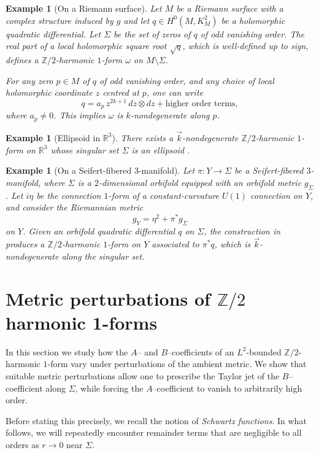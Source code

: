 \documentclass[11pt]{amsart}
\newcommand{\R}{\mathbb{R}}
\newcommand{\ZT}{\mathbb{Z}/2}
\newtheorem{example}[theorem]{Example}
\begin{document}
\begin{example}[On a Riemann surface]
	Let $M$ be a Riemann surface with a complex structure induced by $g$ and let $q\in H^0(M,K_M^2)$ be a holomorphic quadratic differential. 
	Let $\Sigma$ be the set of zeros of $q$ of odd vanishing order.
	The real part of a local holomorphic square root $\sqrt{q}$, which is well-defined up to sign, defines a $\ZT$-harmonic $1$-form $\omega$ on $M\setminus \Sigma$.
	
	For any zero $p \in M$ of $q$ of odd vanishing order, and any choice of local holomorphic coordinate $z$ centred at $p$, one can write
	\[
	q = a_p\, z^{2k+1}\, dz\otimes dz + \text{higher order terms},
	\]
	where $a_p\neq 0$. This implies $\omega$ is $k$-nondegenerate along $p$.
\end{example}

\begin{example}[Ellipsoid in $\R^3$]
	There exists a $\vec{k}$-nondegenerate $\ZT$-harmonic $1$-form on $\R^3$ whose singular set $\Sigma$
	is an ellipsoid \cite{ChenHeYan26Calabi}.
\end{example}

\begin{example}[On a Seifert-fibered $3$-manifold]
	Let $\pi:Y\to \Sigma$ be a Seifert-fibered $3$-manifold, where $\Sigma$ is a $2$-dimensional orbifold
	equipped with an orbifold metric $g_{\Sigma}$. Let $i\eta$ be the connection $1$-form of a
	constant-curvature $U(1)$ connection on $Y$, and consider the Riemannian metric
	\[
	g_Y=\eta^2+\pi^*g_{\Sigma}
	\]
	on $Y$. Given an orbifold quadratic differential $q$ on $\Sigma$, the construction in
	\cite[Section~4.3]{HeParker2024} produces a $\ZT$-harmonic $1$-form on $Y$ associated to $\pi^*q$,
	which is $\vec{k}$-nondegenerate along the singular set.
\end{example}

\section{Metric perturbations of \texorpdfstring{$\ZT$}{Z/2} harmonic 1-forms}
\label{sec_metric_perturbation}
In this section we study how the $A$-- and $B$--coefficients of an $L^2$-bounded $\ZT$-harmonic
$1$-form vary under perturbations of the ambient metric. We show that suitable metric
perturbations allow one to prescribe the Taylor jet of the $B$--coefficient along $\Sigma$,
while forcing the $A$--coefficient to vanish to arbitrarily high order.

Before stating this precisely, we recall the notion of \emph{Schwartz functions}. In what follows,
we will repeatedly encounter remainder terms that are negligible to all orders as $r\to 0$ near
$\Sigma$.
\end{document}
